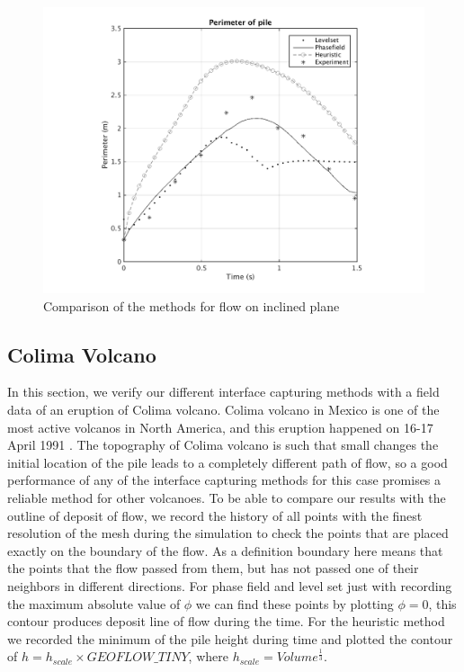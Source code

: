 \documentclass[letterpaper,10pt]{article}
\begin{document}
\begin{figure}[H]
\begin{minipage}[b]{.48 \linewidth}
    \includegraphics[scale=0.48]{IMAGES/perimeter.png}
  \end{minipage}
  \caption{Comparison of the methods for flow on inclined plane}
  \label{compinc}
\end{figure}

\subsection{Colima Volcano}
In this section, we verify our different interface capturing methods with a field data of an eruption of Colima volcano. 
Colima volcano in Mexico is one of the most active volcanos in North America, and this eruption happened on 16-17 April 1991 \cite{Charbonnier2008}. 
The topography of Colima volcano is such that small changes the initial location of the pile leads to a completely different 
path of flow, so a good performance of any of the interface capturing methods for this case promises a reliable method for other volcanoes.
To be able to compare our results with the outline of deposit of flow, we record the history of all points with the finest 
resolution of the mesh during the simulation to check the points that are placed exactly on the boundary of the flow. 
As a definition boundary here means that the points that the flow passed from them, but has not passed one of their neighbors 
in different directions. For phase field and level set just with recording the maximum absolute value of $ \phi $ we can find 
these points by plotting $\phi=0$, this contour produces deposit line of flow during the time. For the heuristic method we 
recorded the minimum of the pile height during time and plotted the contour of $ h = h_{scale} \times GEOFLOW \_ TINY$, where 
$ h_{scale} =Volume^\frac{1}{3} $.
\end{document}
